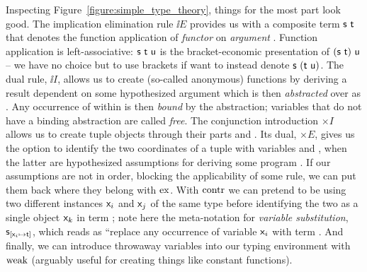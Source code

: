 Inspecting Figure~\ref{figure:simple_type_theory}, things for the most part look good.
The implication elimination rule $\ii E$ provides us with a composite term $\mathsf{s~t}$ that denotes the function application of \textit{functor}  on \textit{argument} .
Function application is left-associative: $\mathsf{s~t~u}$ is the bracket-economic presentation of $(\mathsf{s~t})~\mathsf{u}$ -- we have no choice but to use brackets if want to instead denote $\mathsf{s}~(\mathsf{t~u})$.
The dual rule, $\ii I$, allows us to create (so-called anonymous) functions by deriving a result  dependent on some hypothesized argument \term{\vari } which is then \textit{abstracted} over as .
Any occurrence of \smallterm{\vari } within  is then \textit{bound} by the abstraction; variables that do not have a binding abstraction are called \textit{free}.
The conjunction introduction $\times I$ allows us to create tuple objects  through their parts  and .
Its dual, $\times E$, gives us the option to identify the two coordinates of a tuple  with variables \smallterm{\vari } and \smallterm{\varj}, when the latter are hypothesized assumptions for deriving some program .
If our assumptions are not in order, blocking the applicability of some rule, we can put them back where they belong with $\mathrm{ex}{}$.
With $\mathrm{contr}{}$ we can pretend to be using two different instances $\mathsf{x}_{\mathnormal{i}}$ and $\mathsf{x}_{\mathnormal{j}}$ of the same type before identifying the two as a single object $\mathsf{x}_{\mathnormal{k}}$ in term ;
note here the meta-notation for \textit{variable substitution}, $\mathsf{s}_{[\mathsf{\mathsf{x}_{\mathnormal{i}} } \mapsto \mathsf{t}]}$, which reads as ``replace any occurrence of variable $\mathsf{x}_{\mathnormal{i}}$ with term .
And finally, we can introduce throwaway variables into our typing environment with $\mathrm{weak}{}$ (arguably useful for creating things like constant functions).

